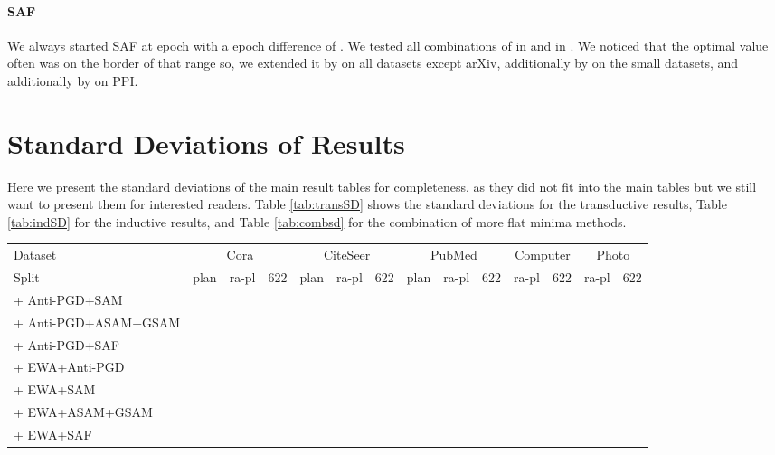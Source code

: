 \documentclass[runningheads]{llncs}
\begin{document}
\paragraph{SAF}
We always started SAF at epoch  with a epoch difference  of .
We tested all combinations of  in  and  in .
We noticed that the optimal  value often was on the border of that range so, we extended it by  on all datasets except arXiv, additionally by  on the small datasets, and additionally by  on PPI.





\section{Standard Deviations of Results}
Here we present the standard deviations of the main result tables for completeness, as they did not fit into the main tables but we still want to present them for interested readers.
Table \ref{tab:transSD} shows the standard deviations for the transductive results, Table \ref{tab:indSD} for the inductive results, and Table \ref{tab:combsd} for the combination of more flat minima methods.

\begin{table*}[!!ht]
    \centering
\caption{SDs of Table \ref{tab:comb}, combined methods on transductive GCN.}
    \label{tab:combsd}
    \tiny
    \begin{tabular}{l|r r r | r r r | r r r | r r | r r }\toprule
    Dataset   & \multicolumn{3}{c|}{Cora} & \multicolumn{3}{c|}{CiteSeer} & \multicolumn{3}{c|}{PubMed} & \multicolumn{2}{c|}{Computer} & \multicolumn{2}{c}{Photo} \\
    Split     & plan & ra-pl & 622 & plan & ra-pl & 622 & plan & ra-pl & 622 & ra-pl & 622 & ra-pl & 622 \\ \midrule
+ Anti-PGD+SAM &  &  &  &  &  &  &  &  &  &  &  &  &  \\
 + Anti-PGD+ASAM+GSAM &  &  &  &  &  &  &  &  &  &  &  &  &  \\
 + Anti-PGD+SAF &  &  &  &  &  &  &  &  &  &  &  &  &  \\
 + EWA+Anti-PGD &  &  &  &  &  &  &  &  &  &  &  &  &  \\
 + EWA+SAM &  &  &  &  &  &  &  &  &  &  &  &  & \\
 + EWA+ASAM+GSAM &  &  &  &  &  &  &  &  &  &  &  &  &  \\
 + EWA+SAF &  &  &  &  &  &  &  &  &  &  &  &  &  \\
    \bottomrule
    \end{tabular}
\end{table*}
\end{document}
